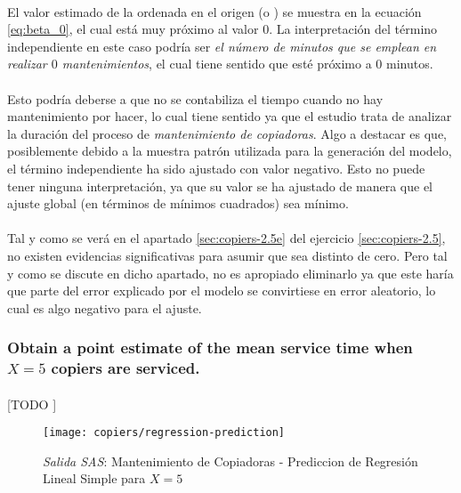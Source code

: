 \documentclass{article}
\begin{document}
        \paragraph{}
        El valor estimado de la ordenada en el origen (o ) se muestra en la ecuación \eqref{eq:beta_0}, el cual está muy próximo al valor $0$. La interpretación del término independiente en este caso podría ser \emph{el número de minutos que se emplean en realizar $0$ mantenimientos}, el cual tiene sentido que esté próximo a $0$ minutos.

        \paragraph{}
        Esto podría deberse a que no se contabiliza el tiempo cuando no hay mantenimiento por hacer, lo cual tiene sentido ya que el estudio trata de analizar la duración del proceso de \emph{mantenimiento de copiadoras}. Algo a destacar es que, posiblemente debido a la muestra patrón utilizada para la generación del modelo, el término independiente ha sido ajustado con valor negativo. Esto no puede tener ninguna interpretación, ya que su valor se ha ajustado de manera que el ajuste global (en términos de mínimos cuadrados) sea mínimo.

        \paragraph{}
        Tal y como se verá en el apartado \ref{sec:copiers-2.5e} del ejercicio \ref{sec:copiers-2.5}, no existen evidencias significativas para asumir que sea distinto de cero. Pero tal y como se discute en dicho apartado, no es apropiado eliminarlo ya que este haría que parte del error explicado por el modelo se convirtiese en error aleatorio, lo cual es algo negativo para el ajuste.


      \subsubsection{Obtain a point estimate of the mean service time when $X = 5$ copiers are serviced.}

        \paragraph{}
        [TODO ]

        \begin{figure}[!h]
          \centering
          \texttt{[image: copiers/regression-prediction]}
          \caption{\emph{Salida SAS}: Mantenimiento de Copiadoras - Prediccion de Regresión Lineal Simple para $X = 5$}
          \label{img:copiers-regression-prediction}
        \end{figure}
\end{document}
